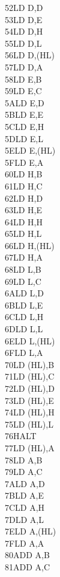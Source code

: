 \documentclass[twoside,openright,a4paper]{book}
\begin{document}
\begin{multicols}{3}
{\begin{tabbing}
	52\>LD D,D\\
	53\>LD D,E\\
	54\>LD D,H\\
	55\>LD D,L\\
	56\>LD D,(HL)\\
	57\>LD D,A\\
	58\>LD E,B\\
	59\>LD E,C\\
	5A\>LD E,D\\
	5B\>LD E,E\\
	5C\>LD E,H\\
	5D\>LD E,L\\
	5E\>LD E,(HL)\\
	5F\>LD E,A\\
	60\>LD H,B\\
	61\>LD H,C\\
	62\>LD H,D\\
	63\>LD H,E\\
	64\>LD H,H\\
	65\>LD H,L\\
	66\>LD H,(HL)\\
	67\>LD H,A\\
	68\>LD L,B\\
	69\>LD L,C\\
	6A\>LD L,D\\
	6B\>LD L,E\\
	6C\>LD L,H\\
	6D\>LD L,L\\
	6E\>LD L,(HL)\\
	6F\>LD L,A\\
	70\>LD (HL),B\\
	71\>LD (HL),C\\
	72\>LD (HL),D\\
	73\>LD (HL),E\\
	74\>LD (HL),H\\
	75\>LD (HL),L\\
	76\>HALT\\
	77\>LD (HL),A\\
	78\>LD A,B\\
	79\>LD A,C\\
	7A\>LD A,D\\
	7B\>LD A,E\\
	7C\>LD A,H\\
	7D\>LD A,L\\
	7E\>LD A,(HL)\\
	7F\>LD A,A\\
	80\>ADD A,B\\
	81\>ADD A,C\\

\end{tabbing}}
\end{multicols}
\end{document}
